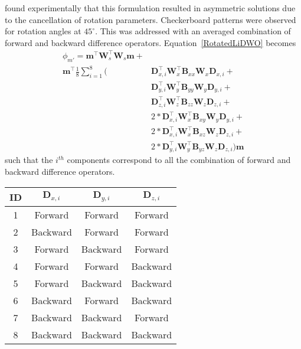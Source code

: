 \cite{PhDLelievre09} found experimentally that this formulation resulted in asymmetric solutions due to the cancellation of rotation parameters. Checkerboard patterns were observed for rotation angles at $45^\circ$. This was addressed with an averaged combination of forward and backward difference operators. Equation~\eqref{RotatedLiDWO} becomes
\begin{equation}\label{RotatedLelievre}
\begin{split}
\phi_{m'} = \mathbf{m}^\top \mathbf{W}_s^\top \mathbf{W}_s \mathbf{m} +& \\
\mathbf{m}^\top \frac{1}{8}\sum_{i=1}^8 \bigg(&
\mathbf{D}_{x,i}^\top\mathbf{W}_x^\top \mathbf{B}_{xx}\mathbf{W}_x \mathbf{D}_{x,i} + \\
&\mathbf{D}_{y,i}^\top\mathbf{W}_y^\top \mathbf{B}_{yy}\mathbf{W}_y \mathbf{D}_{y,i} + \\
&\mathbf{D}_{z,i}^\top\mathbf{W}_z^\top \mathbf{B}_{zz}\mathbf{W}_z \mathbf{D}_{z,i} +\\
&2*\mathbf{D}_{x,i}^\top\mathbf{W}_x^\top \mathbf{B}_{xy}\mathbf{W}_y \mathbf{D}_{y,i} + \\
&2*\mathbf{D}_{x,i}^\top \mathbf{W}_x^\top \mathbf{B}_{xz}\mathbf{W}_z \mathbf{D}_{z,i} + \\
&2*\mathbf{D}_{y,i}^\top\mathbf{W}_y^\top \mathbf{B}_{yz}\mathbf{W}_z \mathbf{D}_{z,i} \bigg) \mathbf{m}
\end{split}
\end{equation}
such that the $i^{th}$ components correspond to all the combination of forward and backward difference operators.
\begin{table}\centering
\begin{tabular}{|c|c|c|c|}\hline
ID & $\mathbf{D}_{x,i}$ & $\mathbf{D}_{y,i}$ & $\mathbf{D}_{z,i}$ \\ \hline
1 & Forward & Forward & Forward \\ \hline
2 & Backward & Forward & Forward \\ \hline
3 & Forward & Backward & Forward \\ \hline
4 & Forward & Forward & Backward \\ \hline
5 & Forward & Backward & Backward \\ \hline
6 & Backward & Forward & Backward \\ \hline
7 & Backward & Backward & Forward \\ \hline
8 & Backward & Backward & Backward \\ \hline
\end{tabular}
\end{table}
